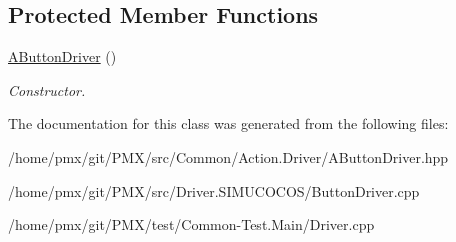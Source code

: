 \subsection*{Protected Member Functions}
\begin{DoxyCompactItemize}
\item 
\mbox{\label{classAButtonDriver_a035c36655b359b7e8e3ae0a3be85c0c9}} 
\hyperlink{classAButtonDriver_a035c36655b359b7e8e3ae0a3be85c0c9}{A\+Button\+Driver} ()
\begin{DoxyCompactList}\small\item\em Constructor. \end{DoxyCompactList}\end{DoxyCompactItemize}


The documentation for this class was generated from the following files\+:\begin{DoxyCompactItemize}
\item 
/home/pmx/git/\+P\+M\+X/src/\+Common/\+Action.\+Driver/A\+Button\+Driver.\+hpp\item 
/home/pmx/git/\+P\+M\+X/src/\+Driver.\+S\+I\+M\+U\+C\+O\+C\+O\+S/Button\+Driver.\+cpp\item 
/home/pmx/git/\+P\+M\+X/test/\+Common-\/\+Test.\+Main/Driver.\+cpp\end{DoxyCompactItemize}
